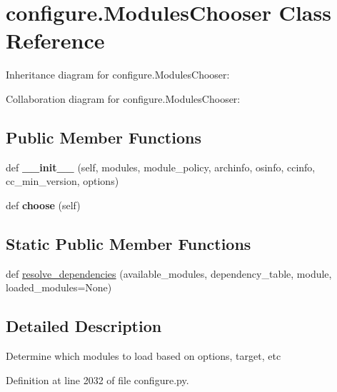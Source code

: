 \hypertarget{classconfigure_1_1_modules_chooser}{}\section{configure.\+Modules\+Chooser Class Reference}
\label{classconfigure_1_1_modules_chooser}


Inheritance diagram for configure.\+Modules\+Chooser\+:


Collaboration diagram for configure.\+Modules\+Chooser\+:
\subsection*{Public Member Functions}
\begin{DoxyCompactItemize}
\item 
\mbox{\label{classconfigure_1_1_modules_chooser_af5b6a4e26c3a076c58baa756ca63f007}} 
def {\bfseries \+\_\+\+\_\+init\+\_\+\+\_\+} (self, modules, module\+\_\+policy, archinfo, osinfo, ccinfo, cc\+\_\+min\+\_\+version, options)
\item 
\mbox{\label{classconfigure_1_1_modules_chooser_aae649afebc1a73b9c97da8ad46669ce6}} 
def {\bfseries choose} (self)
\end{DoxyCompactItemize}
\subsection*{Static Public Member Functions}
\begin{DoxyCompactItemize}
\item 
def \mbox{\hyperlink{classconfigure_1_1_modules_chooser_a3beffd91af562bbee908ec4f1d499bec}{resolve\+\_\+dependencies}} (available\+\_\+modules, dependency\+\_\+table, module, loaded\+\_\+modules=None)
\end{DoxyCompactItemize}


\subsection{Detailed Description}
\begin{DoxyVerb}Determine which modules to load based on options, target, etc
\end{DoxyVerb}
 

Definition at line 2032 of file configure.\+py.




